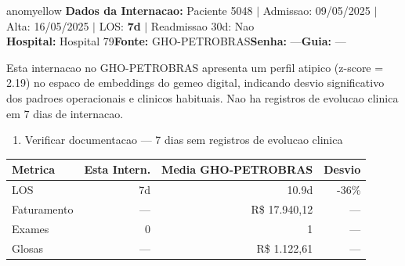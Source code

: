 \documentclass[a4paper,10pt]{article}
\begin{document}
\begin{anomalycard}[Internacao 132070 | GHO-PETROBRAS | MODERADO (z=2.19)]{anomyellow}
\textbf{Dados da Internacao:} Paciente 5048 $\mid$ Admissao: 09/05/2025 $\mid$ Alta: 16/05/2025 $\mid$ LOS: \textbf{7d} $\mid$ Readmissao 30d: Nao\\
\textbf{Hospital:} Hospital 79\quad\textbf{Fonte:} GHO-PETROBRAS\quad\textbf{Senha:} ---\quad\textbf{Guia:} ---\\
\vspace{2pt}\begin{tcolorbox}[colback=severityred!20,colframe=anomyellow,title={\textbf{Interpretacao de Negocio}},fonttitle=\bfseries\small,left=4pt,right=4pt,top=3pt,bottom=3pt]
{\small Esta internacao no GHO-PETROBRAS apresenta um perfil atipico (z-score = 2.19) no espaco de embeddings do gemeo digital, indicando desvio significativo dos padroes operacionais e clinicos habituais. Nao ha registros de evolucao clinica em 7 dias de internacao.}
\end{tcolorbox}
\begin{tcolorbox}[colback=severityyellow!30,colframe=anomorange,title={\textbf{Recomendacoes Especificas}},fonttitle=\bfseries\small,left=4pt,right=4pt,top=3pt,bottom=3pt]
\begin{enumerate}[nosep,leftmargin=16pt]
\item {\small Verificar documentacao --- 7 dias sem registros de evolucao clinica}
\end{enumerate}
\end{tcolorbox}
\begin{center}\begin{tabular}{l r r r}\toprule\textbf{Metrica} & \textbf{Esta Intern.} & \textbf{Media GHO-PETROBRAS} & \textbf{Desvio} \\\midrule
LOS & 7d & 10.9d & -36\% \\
Faturamento & --- & R\$ 17.940,12 & --- \\
Exames & 0 & 1 & --- \\
Glosas & --- & R\$ 1.122,61 & --- \\
\bottomrule\end{tabular}\end{center}


\end{anomalycard}
\end{document}
